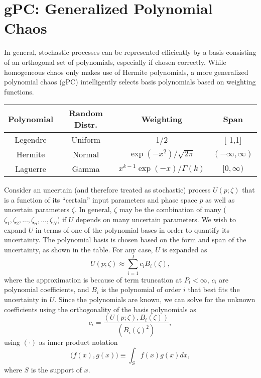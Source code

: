 \section{gPC: Generalized Polynomial Chaos}
In general, stochastic processes can be represented efficiently by a basis consisting of an orthogonal set of polynomials, especially if chosen correctly.  While homogeneous chaos only makes use of Hermite polynomials, a more generalized polynomial chaos (gPC) intelligently selects basis polynomials based on weighting functions.
\begin{center}
\begin{tabular}{c c c c}
Polynomial & Random Distr. & Weighting & Span \\ \hline
Legendre & Uniform & 1/2 & [-1,1] \\
Hermite & Normal &  $\exp(-x^2)/\sqrt{2\pi}$ & $(-\infty,\infty)$ \\
Laguerre & Gamma & $x^{k-1}\exp(-x)/\Gamma(k)$ & $[0,\infty)$
\end{tabular}
\end{center}
Consider an uncertain (and therefore treated as stochastic) process $U(p;\zeta)$ that is a function of its ``certain'' input parameters and phase space $p$ as well as uncertain parameters $\zeta$.  In general, $\zeta$ may be the combination of many ($\zeta_1,\zeta_2,...,\zeta_n,...,\zeta_N$) if $U$ depends on many uncertain parameters.  We wish to expand $U$ in terms of one of the polynomial bases in order to quantify its uncertainty.  The polynomial basis is chosen based on the form and span of the uncertainty, as shown in the table.  For any case, $U$ is expanded as
\begin{equation}
U(p;\zeta)\approx\sum_{i=1}^{I} c_i B_i(\zeta),
\end{equation}
where the approximation is because of term truncation at $P_t<\infty$, $c_i$ are polynomial coefficients, and $B_i$ is the polynomial of order $i$ that best fits the uncertainty in $U$.  Since the polynomials are known, we can solve for the unknown coefficients using the orthogonality of the basis polynomials as
\begin{equation}
c_i=\frac{(U(p;\zeta),B_i(\zeta))}{(B_i(\zeta)^2)},
\end{equation}
using $(\cdot)$ as inner product notation
\begin{equation}
\big(f(x),g(x) \big)\equiv \int_S f(x)g(x)dx,
\end{equation}
where $S$ is the support of $x$.



